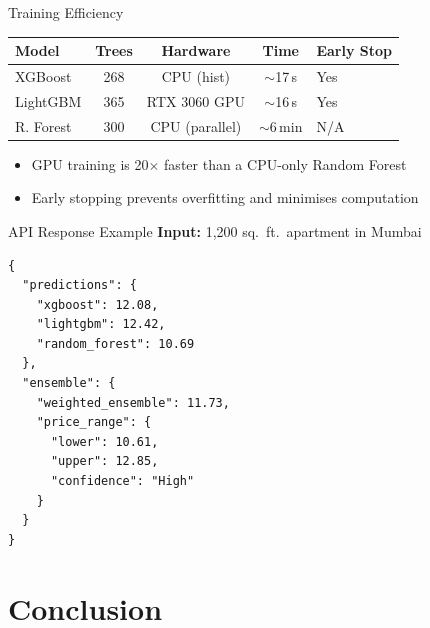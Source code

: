 \documentclass[aspectratio=169, 12pt]{beamer}
\begin{document}
\begin{frame}{Training Efficiency}
  \begin{center}
    \begin{tabular}{lcccl}
      \toprule
      Model & Trees & Hardware & Time & Early Stop \\
      \midrule
      XGBoost  & 268 & CPU (hist) & $\sim$17\,s & Yes \\
      LightGBM & 365 & RTX 3060 GPU & $\sim$16\,s & Yes \\
      R. Forest & 300 & CPU (parallel) & $\sim$6\,min & N/A \\
      \bottomrule
    \end{tabular}
  \end{center}

  \bigskip
  \begin{itemize}
    \item GPU training is 20$\times$ faster than a CPU-only Random Forest
    \item Early stopping prevents overfitting and minimises computation
  \end{itemize}
\end{frame}

\begin{frame}[fragile]{API Response Example}
  \textbf{Input:} 1,200 sq.\ ft.\ apartment in Mumbai

  \medskip
  \begin{lstlisting}[basicstyle=\ttfamily\small, frame=single]
{
  "predictions": {
    "xgboost": 12.08,
    "lightgbm": 12.42,
    "random_forest": 10.69
  },
  "ensemble": {
    "weighted_ensemble": 11.73,
    "price_range": {
      "lower": 10.61,
      "upper": 12.85,
      "confidence": "High"
    }
  }
}
  \end{lstlisting}
\end{frame}

\section{Conclusion}
\end{document}

